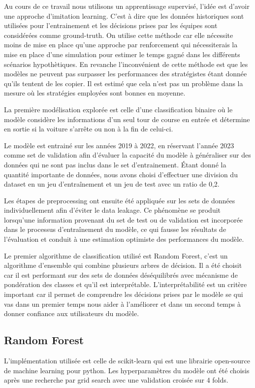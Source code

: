 Au cours de ce travail nous utilisons un apprentissage supervisé, l'idée est d'avoir une approche d'imitation learning.
C'est à dire que les données historiques sont utilisées pour l'entrainement et les décisions prises par les équipes sont considérées comme ground-truth.
On utilise cette méthode car elle nécessite moins de mise en place qu'une approche par renforcement qui nécessiterais la mise en place d'une simulation
pour estimer le temps gagné dans les différents scénarios hypothètiques.
En revanche l'inconvénient de cette méthode est que les modèles ne peuvent pas surpasser les performances des stratégistes étant donnée qu'ils tentent de les copier.
Il est estimé que cela n'est pas un problème dans la mesure où les stratégies employées sont bonnes en moyenne.

La première modélisation explorée est celle d'une classification binaire
où le modèle considère les informations d'un seul tour de course en entrée et détermine en sortie si la voiture s'arrête ou non à la fin de celui-ci.

Le modèle est entrainé sur les années 2019 à 2022, en réservant l'année 2023 comme set de validation afin d'évaluer la capacité du modèle à généraliser
sur des données qui ne sont pas inclus dans le set d'entrainement.
Étant donné la quantité importante de données, nous avons choisi d'effectuer une division du dataset en un jeu d'entraînement et un jeu de test avec un ratio de 0,2.

Les étapes de preprocessing ont ensuite été appliquée sur les sets de données individuellement afin d'éviter le data leakage.
Ce phénomène se produit lorsqu'une information provenant du set de test ou de validation est incorporée dans le processus d'entraînement du modèle,
ce qui fausse les résultats de l'évaluation et conduit à une estimation optimiste des performances du modèle.

Le premier algorithme de classification utilisé est Random Forest, c'est un algorithme d'ensemble qui combine plusieurs arbres de décision.
Il a été choisit car il est performant sur des sets de données déséquilibrés avec mécanisme de pondération des classes et qu'il est interprétable.
L'interprétabilité est un critère important car il permet de comprendre les décisions prises par le modèle se qui vas dans un premier temps nous aider à l'améliorer
et dans un second temps à donner confiance aux utilisateurs du modèle.

\subsection{Random Forest}
L'implémentation utilisée est celle de scikit-learn \cite{scikit-learn-random-forest} qui est une librairie open-source de machine learning pour python.
Les hyperparamètres du modèle ont été choisis après une recherche par grid search avec une validation croisée sur 4 folds.

